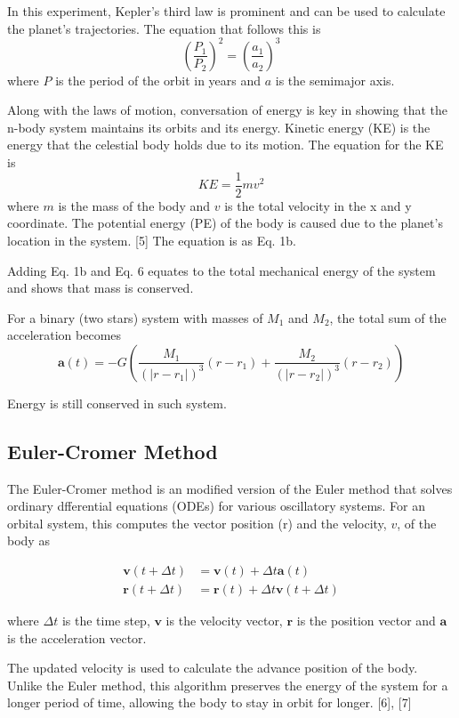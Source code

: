\documentclass[12 pt, a4paper]{article}
\begin{document}
In this experiment, Kepler's third law is prominent and can be used to calculate the planet's trajectories. The equation that follows this is
\[
\left(\frac{P_1}{P_2}\right)^2 = \left(\frac{a_1}{a_2}\right)^3
\tag{Eq. 5}
\]
where $P$ is the period of the orbit in years and $a$ is the semimajor axis.

Along with the laws of motion, conversation of energy is key in showing that the n-body system maintains its orbits and its
energy. Kinetic energy (KE) is the energy that the celestial body holds due to its motion. The equation for the KE is
\[
KE = \frac{1}{2}mv^2
\tag{Eq. 6}
\]
where $m$ is the mass of the body and $v$ is the total velocity in the x and y coordinate. The potential energy (PE) of the body is caused due
to the planet's location in the system. [5] The equation is as Eq. 1b.

Adding Eq. 1b and Eq. 6 equates to the total mechanical energy of the system and shows that mass is conserved.

For a binary (two stars) system with masses of $M_1$ and $M_2$, the total sum of the acceleration becomes
\[
\mathbf{a}(t) = -G\left(\frac{M_1}{(|r - r_1|)^3}(r - r_1) + \frac{M_2}{(|r - r_2|)^3}(r - r_2)\right)
\tag{Eq. 7}
\]

Energy is still conserved in such system.

\subsection{Euler-Cromer Method}
The Euler-Cromer method is an modified version of the Euler method that solves ordinary dfferential equations (ODEs) for various oscillatory 
systems. For an orbital system, this computes the vector position (r) and the velocity, $v$, of the body as

\begin{align}
\mathbf{v}(t+\Delta t) &= \mathbf{v}(t) + \Delta t\mathbf{a}(t) \tag{Eq. 8a}\\
\mathbf{r}(t+\Delta t) &= \mathbf{r}(t) + \Delta t\mathbf{v}(t+\Delta t) \tag{8b}
\end{align}

where $\Delta t$ is the time step, $\mathbf{v}$ is the velocity vector, $\mathbf{r}$ is the position vector and $\mathbf{a}$ is the 
acceleration vector.

The updated velocity is used to calculate the advance position of the body. Unlike the Euler method, this algorithm preserves the energy 
of the system for a longer period of time, allowing the body to stay in orbit for longer. [6], [7]
\end{document}
